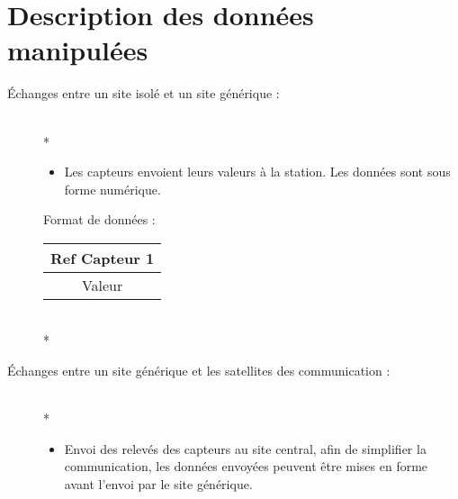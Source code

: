 \section{Description des données manipulées}
\begin{description}
\item[Échanges entre un site isolé et un site générique :]~\\*
	\begin{itemize}
		\item Les capteurs envoient leurs valeurs à la station. Les données sont sous forme numérique.
	\end{itemize}

	Format de données :		
	\begin{tabular}{|c|}
	\hline
	Ref Capteur 1\\
	\hline
	Valeur \\
	\hline
	\end{tabular}
~\\*
\item[Échanges entre un site générique et les satellites des communication :]~\\*
	\begin{itemize}
		\item Envoi des relevés des capteurs au site central, afin de simplifier la communication, les données envoyées peuvent être mises en forme avant l'envoi par le 	site générique.
	\end{itemize}


\end{description}
